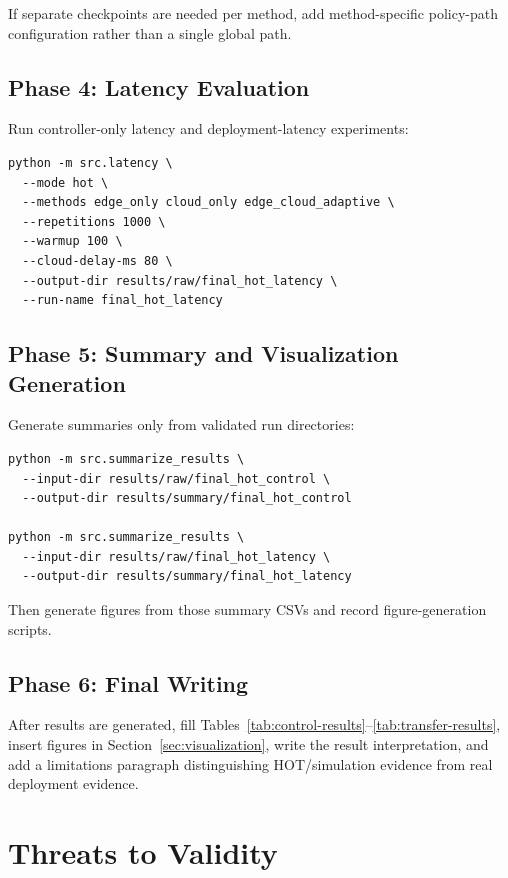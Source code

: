 \documentclass[11pt,a4paper]{article}
\begin{document}
If separate checkpoints are needed per method, add method-specific policy-path configuration rather than a single global path.

\subsection{Phase 4: Latency Evaluation}

Run controller-only latency and deployment-latency experiments:

\begin{verbatim}
python -m src.latency \
  --mode hot \
  --methods edge_only cloud_only edge_cloud_adaptive \
  --repetitions 1000 \
  --warmup 100 \
  --cloud-delay-ms 80 \
  --output-dir results/raw/final_hot_latency \
  --run-name final_hot_latency
\end{verbatim}

\subsection{Phase 5: Summary and Visualization Generation}

Generate summaries only from validated run directories:

\begin{verbatim}
python -m src.summarize_results \
  --input-dir results/raw/final_hot_control \
  --output-dir results/summary/final_hot_control

python -m src.summarize_results \
  --input-dir results/raw/final_hot_latency \
  --output-dir results/summary/final_hot_latency
\end{verbatim}

Then generate figures from those summary CSVs and record figure-generation scripts.

\subsection{Phase 6: Final Writing}

After results are generated, fill Tables~\ref{tab:control-results}--\ref{tab:transfer-results}, insert figures in Section~\ref{sec:visualization}, write the result interpretation, and add a limitations paragraph distinguishing HOT/simulation evidence from real deployment evidence.

\section{Threats to Validity}
\end{document}
